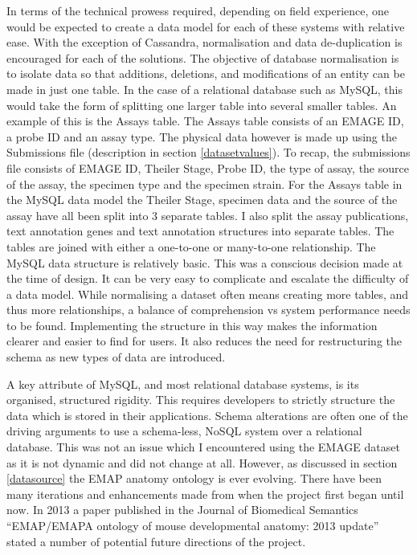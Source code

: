 In terms of the technical prowess required, depending on field experience, one would be expected to create a data model for each of these systems with relative ease. With the exception of Cassandra, normalisation and data de-duplication is encouraged for each of the solutions. The objective of database normalisation is to isolate data so that additions, deletions, and modifications of an entity can be made in just one table. In the case of a relational database such as MySQL, this would take the form of splitting one larger table into several smaller tables. An example of this is the Assays table. The Assays table consists of an EMAGE ID, a probe ID and an assay type. The physical data however is made up using the Submissions file (description in section \ref{datasetvalues}). To recap, the submissions file consists of EMAGE ID, Theiler Stage, Probe ID, the type of assay, the source of the assay, the specimen type and the specimen strain. For the Assays table in the MySQL data model the Theiler Stage, specimen data and the source of the assay have all been split into 3 separate tables. I also split the assay publications, text annotation genes and text annotation structures into separate tables. The tables are joined with either a one-to-one or many-to-one relationship. The MySQL data structure is relatively basic. This was a conscious decision made at the time of design. It can be very easy to complicate and escalate the difficulty of a data model. While normalising a dataset often means creating more tables, and thus more relationships, a balance of comprehension vs system performance needs to be found. Implementing the structure in this way makes the information clearer and easier to find for users. It also reduces the need for restructuring the schema as new types of data are introduced.

A key attribute of MySQL, and most relational database systems, is its organised, structured rigidity. This requires developers to strictly structure the data which is stored in their applications. Schema alterations are often one of the driving arguments to use a schema-less, NoSQL system over a relational database. This was not an issue which I encountered using the EMAGE dataset as it is not dynamic and did not change at all. However, as discussed in section \ref{datasource} the EMAP anatomy ontology is ever evolving. There have been many iterations and enhancements made from when the project first began until now. In 2013 a paper published in the Journal of Biomedical Semantics ``EMAP/EMAPA ontology of mouse developmental anatomy: 2013 update'' stated a number of potential future directions of the project.

